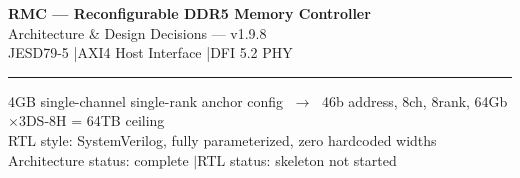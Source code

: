 \documentclass[aspectratio=169,10pt]{beamer}
\begin{document}
\begin{frame}[plain]
  \vspace*{0.6cm}
  \begin{center}
    {\huge\bfseries\color{white}RMC — Reconfigurable DDR5 Memory Controller}\\[6pt]
    {\large\color{cyan!70!white}Architecture \& Design Decisions — v1.9.8}\\[4pt]
    {\small\color{blue!40!white}JESD79-5 \quad|\quad AXI4 Host Interface \quad|\quad DFI 5.2 PHY}
  \end{center}
  \vspace*{0.4cm}
  {\color{Navy!40!white}\rule{\linewidth}{0.4pt}}
  \vspace*{0.3cm}
  \begin{center}
    {\scriptsize\color{blue!40!white}%
    4GB single-channel single-rank anchor config $\;\to\;$ 46b address, 8ch, 8rank, 64Gb$\times$3DS-8H = 64TB ceiling\\[3pt]
    RTL style: SystemVerilog, fully parameterized, zero hardcoded widths\\[3pt]
    Architecture status: complete \quad$\vert$\quad RTL status: skeleton not started}
  \end{center}
\end{frame}
\end{document}
